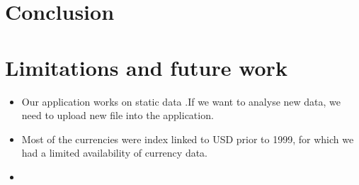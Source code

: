 \section{Conclusion}



     







\section{Limitations and future work}

\begin{itemize}
	\item Our application works on static data .If we want to analyse new data, we need to upload new file into the application.
	\item Most of the currencies were index linked to USD prior to 1999, for which we had a limited availability of currency data.
	\item
\end{itemize}



 







